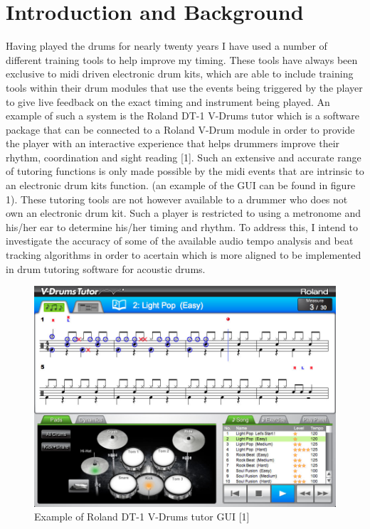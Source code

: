 \documentclass[a4paper, 11pt]{article}
\begin{document}
\maketitle{} \section{Introduction and Background}
Having played the drums for nearly twenty years I have used a number of different training tools to help improve my timing. These tools have always been exclusive to midi driven electronic drum kits, which are able to include training tools within their drum modules that use the events being triggered by the player to give live feedback on the exact timing and instrument being played. An example of such a system is the Roland DT-1 V-Drums tutor which is a software package that can be connected to a Roland V-Drum module in order to provide the player with an interactive experience that helps drummers improve their rhythm, coordination and sight reading [1]. Such an extensive and accurate range of tutoring functions is only made possible by the midi events that are intrinsic to an electronic drum kits function. (an example of the GUI can be found in figure 1). These tutoring tools are not however available to a drummer who does not own an electronic drum kit. Such a player is restricted to using a metronome and his/her ear to determine his/her timing and rhythm. To address this, I intend to investigate the accuracy of some of the available audio tempo analysis and beat tracking algorithms in order to acertain which is more aligned to be implemented in drum tutoring software for acoustic drums.
\begin{figure}[h]
\caption{Example of Roland DT-1 V-Drums tutor GUI [1]}
	\centering
	\includegraphics[scale=0.25]{dt-1_ss_main_notation_gal}
\end{figure}
\end{document}
